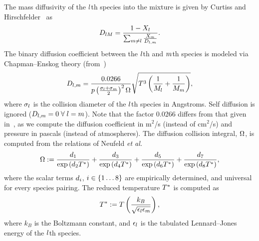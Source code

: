 The mass diffusivity of the $l$th species into the mixture is given by Curtiss and Hirschfelder~\cite{Curtiss1949} as
%
\begin{equation}\label{eq:curtissAvgDiff}
	D_{l M} = \frac{1 - X_{l}}{\sum_{m \neq l} \frac{X_{m}}{D_{l, m}}}.
\end{equation}
%
The binary diffusion coefficient between the $l$th and $m$th species is modeled via Chapman--Enskog theory (from~\cite{propGasLiquid})
%
\begin{equation}
	D_{l, m} = \frac{0.0266}{p \left(\frac{\sigma_{l} + \sigma_{m}}{2}\right)^2 \Omega} \sqrt{T^3 \left(\frac{1}{M_{l}} + \frac{1}{M_{m}}\right)},
\end{equation}
%
where $\sigma_{l}$ is the collision diameter of the $l$th species in Angstroms. Self diffusion is ignored ($D_{l, m} = 0 \; \forall \; l = m$). Note that the factor 0.0266 differs from that given in~\cite{propGasLiquid}, as we compute the diffusion coefficient in m$^2$/s (instead of cm$^2$/s) and pressure in pascals (instead of atmospheres). The diffusion collision integral, $\Omega$, is computed from the relations of Neufeld \textit{et al.}~\cite{Neufeld1972}
%
\begin{equation}
	\Omega := \frac{d_{1}}{\text{exp} \left(d_{2} T^*\right)} + \frac{d_{3}}{\text{exp} \left(d_{4} T^*\right)} + \frac{d_{5}}{\text{exp} \left(d_{6} T^*\right)} + \frac{d_{7}}{\text{exp} \left(d_{8} T^*\right)},
\end{equation}
%
where the scalar terms $d_{i}$, $i \in \{1 \hdots 8\}$ are empirically determined, and universal for every species pairing. The reduced temperature $T^*$ is computed as
\begin{equation}
	T^* := T \left( \frac{k_B}{\sqrt{\epsilon_{l} \epsilon_{m}}} \right),
\end{equation}
where $k_B$ is the Boltzmann constant, and $\epsilon_{l}$ is the tabulated Lennard--Jones energy of the $l$th species.

